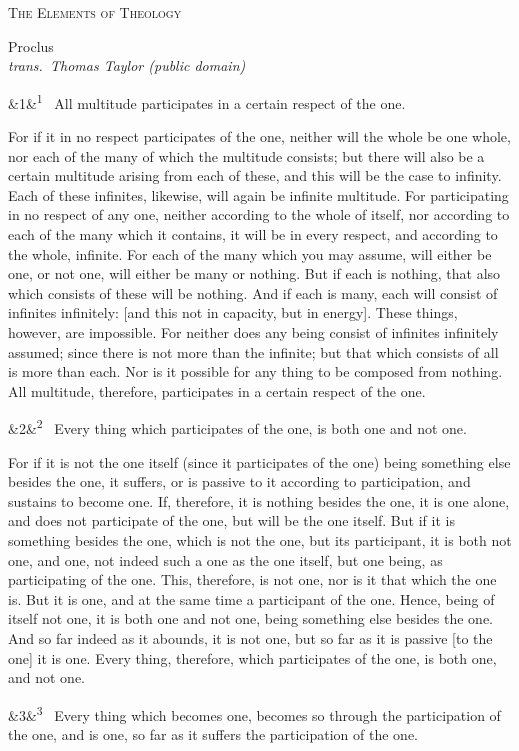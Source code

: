 \documentclass[12pt]{article}
\newcommand{\work}[1]{\begin{center}\LARGE\scshape #1\end{center}}
\newcommand{\attrib}[2]{\begin{center}\large #1\\[2pt]\small\itshape trans.\ #2\end{center}\vspace{1em}}
\newcommand{\para}[1][]{\par\noindent\ifx&#1&\else\textsuperscript{\footnotesize #1}~\fi}
\begin{document}
\work{The Elements of Theology}
\attrib{Proclus}{Thomas Taylor (public domain)}

\para[1] All multitude participates in a certain respect of the one.

For if it in no respect participates of the one, neither will the whole be one whole, nor each of the many of which the multitude consists; but there will also be a certain multitude arising from each of these, and this will be the case to infinity. Each of these infinites, likewise, will again be infinite multitude. For participating in no respect of any one, neither according to the whole of itself, nor according to each of the many which it contains, it will be in every respect, and according to the whole, infinite. For each of the many which you may assume, will either be one, or not one, will either be many or nothing. But if each is nothing, that also which consists of these will be nothing. And if each is many, each will consist of infinites infinitely: [and this not in capacity, but in energy]. These things, however, are impossible. For neither does any being consist of infinites infinitely assumed; since there is not more than the infinite; but that which consists of all is more than each. Nor is it possible for any thing to be composed from nothing. All multitude, therefore, participates in a certain respect of the one.

\para[2] Every thing which participates of the one, is both one and not one.

For if it is not the one itself (since it participates of the one) being something else besides the one, it suffers, or is passive to it according to participation, and sustains to become one. If, therefore, it is nothing besides the one, it is one alone, and does not participate of the one, but will be the one itself. But if it is something besides the one, which is not the one, but its participant, it is both not one, and one, not indeed such a one as the one itself, but one being, as participating of the one. This, therefore, is not one, nor is it that which the one is. But it is one, and at the same time a participant of the one. Hence, being of itself not one, it is both one and not one, being something else besides the one. And so far indeed as it abounds, it is not one, but so far as it is passive [to the one] it is one. Every thing, therefore, which participates of the one, is both one, and not one.

\para[3] Every thing which becomes one, becomes so through the participation of the one, and is one, so far as it suffers the participation of the one.
\end{document}

